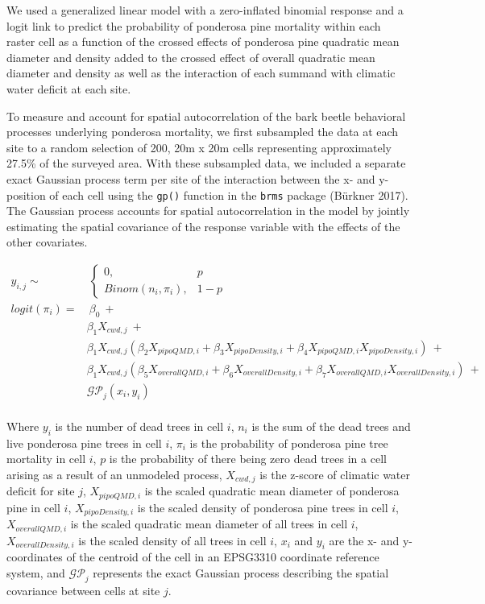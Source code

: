 \documentclass[]{article}
\begin{document}
We used a generalized linear model with a zero-inflated binomial
response and a logit link to predict the probability of ponderosa pine
mortality within each raster cell as a function of the crossed effects
of ponderosa pine quadratic mean diameter and density added to the
crossed effect of overall quadratic mean diameter and density as well as
the interaction of each summand with climatic water deficit at each
site.

To measure and account for spatial autocorrelation of the bark beetle
behavioral processes underlying ponderosa mortality, we first subsampled
the data at each site to a random selection of 200, 20m x 20m cells
representing approximately 27.5\% of the surveyed area. With these
subsampled data, we included a separate exact Gaussian process term per
site of the interaction between the x- and y-position of each cell using
the \texttt{gp()} function in the \texttt{brms} package (Bürkner 2017).
The Gaussian process accounts for spatial autocorrelation in the model
by jointly estimating the spatial covariance of the response variable
with the effects of the other covariates.

\[
\begin{aligned}
y_{i,j} \sim &\ \begin{cases}
    0, & p \\
    Binom(n_i, \pi_i), & 1-p
  \end{cases} \\
logit(\pi_i) = &\ \beta_0\ + \\
& \beta_1X_{cwd, j}\ + \\
& \beta_1X_{cwd, j}(\beta_2X_{pipoQMD, i} + \beta_3X_{pipoDensity, i} + \beta_4X_{pipoQMD, i}X_{pipoDensity, i})\ + \\ 
& \beta_1X_{cwd, j}(\beta_5X_{overallQMD, i} + \beta_6X_{overallDensity, i} + \beta_7X_{overallQMD, i}X_{overallDensity, i})\ + \\
& \mathcal{GP}_j(x_i, y_i) \\
\end{aligned}
\]

Where \(y_i\) is the number of dead trees in cell \(i\), \(n_i\) is the
sum of the dead trees and live ponderosa pine trees in cell \(i\),
\(\pi_i\) is the probability of ponderosa pine tree mortality in cell
\(i\), \(p\) is the probability of there being zero dead trees in a cell
arising as a result of an unmodeled process, \(X_{cwd, j}\) is the
z-score of climatic water deficit for site \(j\), \(X_{pipoQMD, i}\) is
the scaled quadratic mean diameter of ponderosa pine in cell \(i\),
\(X_{pipoDensity, i}\) is the scaled density of ponderosa pine trees in
cell \(i\), \(X_{overallQMD, i}\) is the scaled quadratic mean diameter
of all trees in cell \(i\), \(X_{overallDensity, i}\) is the scaled
density of all trees in cell \(i\), \(x_i\) and \(y_i\) are the x- and
y- coordinates of the centroid of the cell in an EPSG3310 coordinate
reference system, and \(\mathcal{GP}_j\) represents the exact Gaussian
process describing the spatial covariance between cells at site \(j\).
\end{document}
